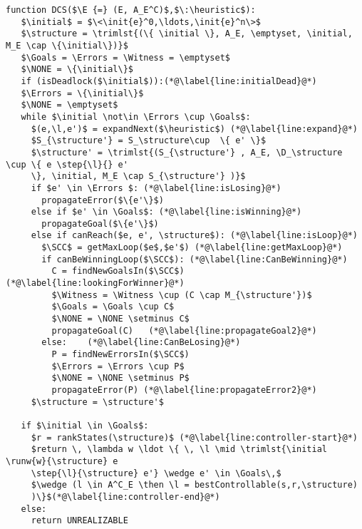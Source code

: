 \lstset{numbers=left, numberstyle=\tiny, stepnumber=1, numbersep=5pt}
\begin{lstlisting}[language={pseudocode},label={lst:dcs},caption={On-the-fly Directed Exploration Procedure.},float=ht, frame=single]
 function DCS($\E {=} (E, A_E^C)$,$\:\heuristic$):
   $\initial$ = $\<\init{e}^0,\ldots,\init{e}^n\>$
   $\structure = \trimlst{(\{ \initial \}, A_E, \emptyset, \initial, M_E \cap \{\initial\})}$
   $\Goals = \Errors = \Witness = \emptyset$
   $\NONE = \{\initial\}$
   if (isDeadlock($\initial$)):(*@\label{line:initialDead}@*)
   $\Errors = \{\initial\}$
   $\NONE = \emptyset$
   while $\initial \not\in \Errors \cup \Goals$:
     $(e,\l,e')$ = expandNext($\heuristic$) (*@\label{line:expand}@*)
     $S_{\structure'} = S_\structure\cup  \{ e' \}$
     $\structure' = \trimlst{(S_{\structure'} , A_E, \D_\structure \cup \{ e \step{\l}{} e' 
     \}, \initial, M_E \cap S_{\structure'} )}$
     if $e' \in \Errors $: (*@\label{line:isLosing}@*)
       propagateError($\{e'\}$)
     else if $e' \in \Goals$: (*@\label{line:isWinning}@*)
       propagateGoal($\{e'\}$)
     else if canReach($e, e', \structure$): (*@\label{line:isLoop}@*)
       $\SCC$ = getMaxLoop($e$,$e'$) (*@\label{line:getMaxLoop}@*)
       if canBeWinningLoop($\SCC$): (*@\label{line:CanBeWinning}@*)
         C = findNewGoalsIn($\SCC$) (*@\label{line:lookingForWinner}@*)
         $\Witness = \Witness \cup (C \cap M_{\structure'})$
         $\Goals = \Goals \cup C$
         $\NONE = \NONE \setminus C$
         propagateGoal(C)   (*@\label{line:propagateGoal2}@*)
       else:    (*@\label{line:CanBeLosing}@*)
         P = findNewErrorsIn($\SCC$)
         $\Errors = \Errors \cup P$
         $\NONE = \NONE \setminus P$
         propagateError(P) (*@\label{line:propagateError2}@*)
     $\structure = \structure'$
 
   if $\initial \in \Goals$:
     $r = rankStates(\structure)$ (*@\label{line:controller-start}@*)
     $return \, \lambda w \ldot \{ \, \l \mid \trimlst{\initial \runw{w}{\structure} e 
     \step{\l}{\structure} e'} \wedge e' \in \Goals\,$
     $\wedge (l \in A^C_E \then \l = bestControllable(s,r,\structure) 
     )\}$(*@\label{line:controller-end}@*)
   else:
     return UNREALIZABLE
\end{lstlisting}  

